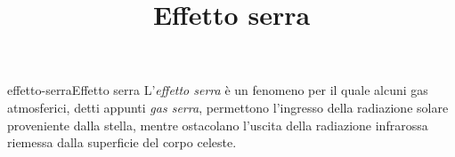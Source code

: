 \documentclass[preview]{standalone}
\begin{document}
\title{Effetto serra}
\genpage

\begin{snippetdefinition}{effetto-serra}{Effetto serra}
    L'\textit{effetto serra} è un fenomeno per il quale alcuni gas
    atmosferici, detti appunti \textit{gas serra},
    permettono l'ingresso della radiazione solare proveniente dalla stella, 
    mentre ostacolano l'uscita della radiazione infrarossa riemessa dalla
    superficie del corpo celeste.
\end{snippetdefinition}



\end{document}
